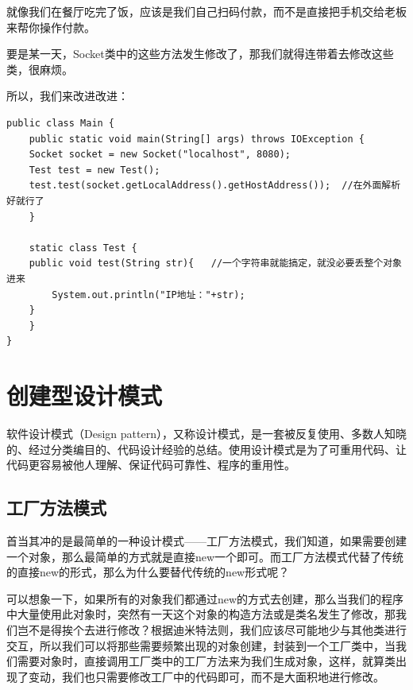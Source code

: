 \documentclass[11pt]{article}
\begin{document}
就像我们在餐厅吃完了饭，应该是我们自己扫码付款，而不是直接把手机交给老板来帮你操作付款。

要是某一天，Socket类中的这些方法发生修改了，那我们就得连带着去修改这些类，很麻烦。

所以，我们来改进改进：
\begin{verbatim}
public class Main {
    public static void main(String[] args) throws IOException {
	Socket socket = new Socket("localhost", 8080);
	Test test = new Test();
	test.test(socket.getLocalAddress().getHostAddress());  //在外面解析好就行了
    }

    static class Test {
	public void test(String str){   //一个字符串就能搞定，就没必要丢整个对象进来
	    System.out.println("IP地址："+str);
	}
    }
}
\end{verbatim}

\section{创建型设计模式}
\label{sec:orgce61bb5}
软件设计模式（Design pattern），又称设计模式，是一套被反复使用、多数人知晓的、经过分类编目的、代码设计经验的总结。使用设计模式是为了可重用代码、让代码更容易被他人理解、保证代码可靠性、程序的重用性。

\subsection{工厂方法模式}
\label{sec:orgc320cc7}
首当其冲的是最简单的一种设计模式——工厂方法模式，我们知道，如果需要创建一个对象，那么最简单的方式就是直接new一个即可。而工厂方法模式代替了传统的直接new的形式，那么为什么要替代传统的new形式呢？

可以想象一下，如果所有的对象我们都通过new的方式去创建，那么当我们的程序中大量使用此对象时，突然有一天这个对象的构造方法或是类名发生了修改，那我们岂不是得挨个去进行修改？根据迪米特法则，我们应该尽可能地少与其他类进行交互，所以我们可以将那些需要频繁出现的对象创建，封装到一个工厂类中，当我们需要对象时，直接调用工厂类中的工厂方法来为我们生成对象，这样，就算类出现了变动，我们也只需要修改工厂中的代码即可，而不是大面积地进行修改。
\end{document}
